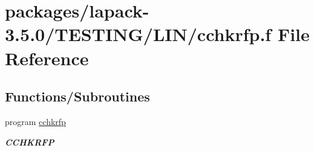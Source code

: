 \hypertarget{cchkrfp_8f}{}\section{packages/lapack-\/3.5.0/\+T\+E\+S\+T\+I\+N\+G/\+L\+I\+N/cchkrfp.f File Reference}
\label{cchkrfp_8f}
\subsection*{Functions/\+Subroutines}
\begin{DoxyCompactItemize}
\item 
program \hyperlink{group__complex__lin_ga6acbc6e5de1f0ea2cf3e6a2ba6b42691}{cchkrfp}
\begin{DoxyCompactList}\small\item\em {\bfseries C\+C\+H\+K\+R\+F\+P} \end{DoxyCompactList}\end{DoxyCompactItemize}
